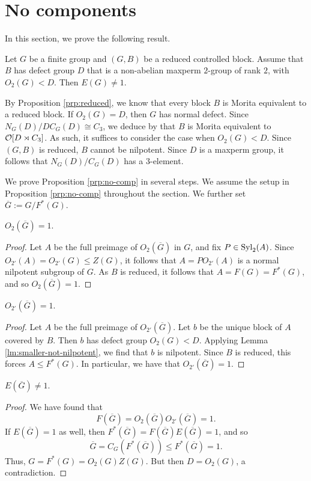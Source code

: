\documentclass[bysection, amsart]{standard}
\begin{document}
\section{No components} \label{sec:no-comp}
In this section, we prove the following result.

\begin{proposition} \label{prp:no-comp}
    Let $G$ be a finite group and $(G, B)$ be a reduced controlled block. Assume that $B$ has defect group $D$ that is a non-abelian maxperm $2$-group of rank $2$, with $O_2(G) < D$. Then $E(G) \neq 1$.
\end{proposition}
By Proposition \ref{prp:reduced}, we know that every block $B$ is Morita equivalent to a reduced block. If $O_2(G) = D$, then $G$ has normal defect. Since $N_G(D)/DC_G(D) \cong C_3$, we deduce by \cite{paper:kul-normals} that $B$ is Morita equivalent to $\mathcal{O} [D \rtimes C_3]$. As such, it suffices to consider the case when $O_2(G) < D$. Since $(G, B)$ is reduced, $B$ cannot be nilpotent. Since $D$ is a maxperm group, it follows that $N_G(D)/C_G(D)$ has a $3$-element.

We prove Proposition \ref{prp:no-comp} in several steps. We assume the setup in Proposition \ref{prp:no-comp} throughout the section. We further set $\overline{G} := G/F^*(G)$.

\begin{lemma}
    $O_2(\overline{G}) = 1$.
\end{lemma}
\begin{proof}
    Let $A$ be the full preimage of $O_2(\overline{G})$ in $G$, and fix $P \in \operatorname{Syl}_2(A)$. Since $O_{2'}(A) = O_{2'}(G) \leq Z(G)$, it follows that $A = P O_{2'}(A)$ is a normal nilpotent subgroup of $G$. As $B$ is reduced, it follows that $A = F(G) = F^*(G)$, and so $O_2(\overline{G}) = 1$.
\end{proof}

\begin{lemma}
    $O_{2'}(\overline{G}) = 1$.
\end{lemma}
\begin{proof}
    Let $A$ be the full preimage of $O_{2'}(\overline{G})$. Let $b$ be the unique block of $A$ covered by $B$. Then $b$ has defect group $O_2(G) < D$. Applying Lemma \ref{lm:smaller-not-nilpotent}, we find that $b$ is nilpotent. Since $B$ is reduced, this forces $A \leq F^*(G)$. In particular, we have that $O_{2'}(\overline{G}) = 1$.
\end{proof}

\begin{lemma}
    $E(\overline{G}) \neq 1$.
\end{lemma}
\begin{proof}
    We have found that
    \[F(\overline{G}) = O_2(\overline{G}) O_{2'}(\overline{G}) = 1.\]
    If $E(\overline{G}) = 1$ as well, then $F^*(\overline{G}) = F(\overline{G}) E(\overline{G}) = 1$, and so
    \[\overline{G} = C_G(F^*(\overline{G})) \leq F^*(\overline{G}) = 1.\]
    Thus, $G = F^*(G) = O_2(G) Z(G)$. But then $D = O_2(G)$, a contradiction.
\end{proof}
\end{document}

